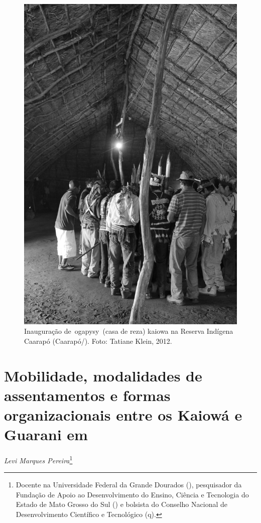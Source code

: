 {{\begin{figure}
  \centering
 \includegraphics[width=\textwidth]{./img/GUARANIS-img6.jpg}	
  \hfill
  \caption{Inauguração de~ogapysy~(casa de reza) kaiowa na Reserva Indígena
Caarapó (Caarapó/). Foto: Tatiane Klein, 2012.}
\end{figure}

 

\chapter{Mobilidade, modalidades de assentamentos e formas organizacionais entre
os Kaiowá e Guarani em }
\begin{flushright}
\emph{Levi Marques Pereira}\footnote{Docente na Universidade Federal da
Grande Dourados (), pesquisador da Fundação de Apoio ao Desenvolvimento do Ensino, Ciência e Tecnologia do Estado de Mato Grosso do Sul () e bolsista do Conselho Nacional de Desenvolvimento Científico e Tecnológico (q).} 
\end{flushright}

}}
